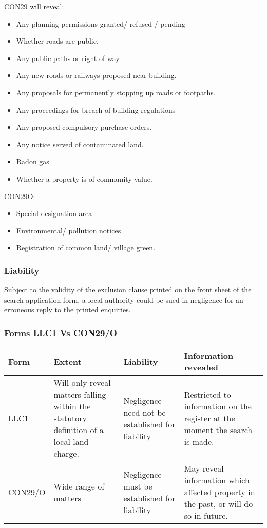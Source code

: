 \documentclass[
]{article}
\providecommand{\tightlist}{%
  \setlength{\itemsep}{0pt}\setlength{\parskip}{0pt}}
\begin{document}
CON29 will reveal:

\begin{itemize}
\tightlist
\item
  Any planning permissions granted/ refused / pending
\item
  Whether roads are public.
\item
  Any public paths or right of way
\item
  Any new roads or railways proposed near building.
\item
  Any proposals for permanently stopping up roads or footpaths.
\item
  Any proceedings for breach of building regulations
\item
  Any proposed compulsory purchase orders.
\item
  Any notice served of contaminated land.
\item
  Radon gas
\item
  Whether a property is of community value.
\end{itemize}

CON29O:

\begin{itemize}
\tightlist
\item
  Special designation area
\item
  Environmental/ pollution notices
\item
  Registration of common land/ village green.
\end{itemize}

\hypertarget{liability-1}{%
\subsubsection{Liability}\label{liability-1}}

Subject to the validity of the exclusion clause printed on the front
sheet of the search application form, a local authority could be sued in
negligence for an erroneous reply to the printed enquiries.

\hypertarget{forms-llc1-vs-con29o}{%
\subsubsection{Forms LLC1 Vs CON29/O}\label{forms-llc1-vs-con29o}}

\begin{longtable}[]{@{}llll@{}}
\toprule()
Form & Extent & Liability & Information revealed \\
\midrule()
\endhead
LLC1 & Will only reveal matters falling within the statutory definition
of a local land charge. & Negligence need not be established for
liability & Restricted to information on the register at the moment the
search is made. \\
CON29/O & Wide range of matters & Negligence must be established for
liability & May reveal information which affected property in the past,
or will do so in future. \\
\bottomrule()
\end{longtable}
\end{document}
